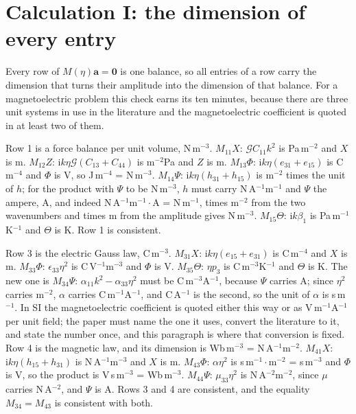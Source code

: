 \documentclass[11pt]{article}
\makeatletter
\newif\ifshowworked
\newenvironment{worked}{%
  \ifshowworked\par\smallskip\noindent\textit{Working.}\par\smallskip\else
  \setbox\z@\vbox\bgroup\fi}{\ifshowworked\par\smallskip\else\egroup\fi}
\newcommand{\ii}{\mathrm{i}}
\newcommand{\Gcal}{\mathcal{G}}
\makeatother
\begin{document}
\section{Calculation I: the dimension of every entry}

Every row of $M(\eta)\mathbf a=\mathbf 0$ is one balance, so all entries of a row carry the dimension that
turns their amplitude into the dimension of that balance. For a magnetoelectric problem this check earns its
ten minutes, because there are three unit systems in use in the literature and the magnetoelectric
coefficient is quoted in at least two of them.

\begin{worked}
Row 1 is a force balance per unit volume, N\,m$^{-3}$. $M_{11}X$: $\Gcal C_{11}k^2$ is Pa\,m$^{-2}$ and $X$
is m. $M_{12}Z$: $\ii k\eta\Gcal(C_{13}+C_{44})$ is m$^{-2}$Pa and $Z$ is m. $M_{13}\Phi$:
$\ii k\eta(e_{31}+e_{15})$ is C\,m$^{-4}$ and $\Phi$ is V, so J\,m$^{-4}$ = N\,m$^{-3}$. $M_{14}\Psi$:
$\ii k\eta(h_{31}+h_{15})$ is m$^{-2}$ times the unit of $h$; for the product with $\Psi$ to be N\,m$^{-3}$,
$h$ must carry N\,A$^{-1}$m$^{-1}$ and $\Psi$ the ampere, A, and indeed N\,A$^{-1}$m$^{-1}\cdot$A = N\,m$^{-1}$,
times m$^{-2}$ from the two wavenumbers and times m from the amplitude gives N\,m$^{-3}$. $M_{15}\Theta$:
$\ii k\beta_1$ is Pa\,m$^{-1}$K$^{-1}$ and $\Theta$ is K. Row 1 is consistent.
\end{worked}

\begin{worked}
Row 3 is the electric Gauss law, C\,m$^{-3}$. $M_{31}X$: $\ii k\eta(e_{15}+e_{31})$ is C\,m$^{-4}$ and $X$
is m. $M_{33}\Phi$: $\epsilon_{33}\eta^2$ is C\,V$^{-1}$m$^{-3}$ and $\Phi$ is V. $M_{35}\Theta$:
$\eta p_3$ is C\,m$^{-3}$K$^{-1}$ and $\Theta$ is K. The new one is $M_{34}\Psi$:
$\alpha_{11}k^2-\alpha_{33}\eta^2$ must be C\,m$^{-3}$A$^{-1}$, because $\Psi$ carries A; since $\eta^2$
carries m$^{-2}$, $\alpha$ carries C\,m$^{-1}$A$^{-1}$, and C\,A$^{-1}$ is the second, so the unit of
$\alpha$ is s\,m$^{-1}$. In SI the magnetoelectric coefficient is quoted either this way or as
V\,m$^{-1}$A$^{-1}$ per unit field; the paper must name the one it uses, convert the literature to it, and
state the number once, and this paragraph is where that conversion is fixed.
Row 4 is the magnetic law, and its dimension is Wb\,m$^{-3}$ = N\,A$^{-1}$m$^{-2}$. $M_{41}X$:
$\ii k\eta(h_{15}+h_{31})$ is N\,A$^{-1}$m$^{-3}$ and $X$ is m. $M_{43}\Phi$: $\alpha\eta^2$ is
s\,m$^{-1}\cdot$m$^{-2}$ = s\,m$^{-3}$ and $\Phi$ is V, so the product is V\,s\,m$^{-3}$ = Wb\,m$^{-3}$. $M_{44}\Psi$: $\mu_{33}\eta^2$ is
N\,A$^{-2}$m$^{-2}$, since $\mu$ carries N\,A$^{-2}$, and $\Psi$ is A. Rows 3 and 4 are consistent, and the
equality $M_{34}=M_{43}$ is consistent with both.
\end{worked}
\end{document}
